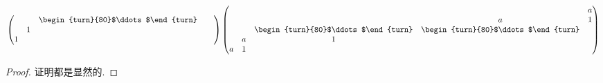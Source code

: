 \documentclass[../../main.tex]{subfiles}
\begin{document}
\begin{lemma}
\begin{align*}
\begin{pmatrix}
& & \begin{turn}{80}$\ddots$\end{turn} & & \\
& 1 & & & \\
1 & & & &
\end{pmatrix}
\begin{pmatrix}
& & & & a \\
& & & a & 1 \\
& & \begin{turn}{80}$\ddots$\end{turn} & \begin{turn}{80}$\ddots$\end{turn} & \\
& a & 1 & & \\
a & 1 & & &
\end{pmatrix}
\end{align*}
\end{lemma}
\begin{proof}
证明都是显然的.

\end{proof}
\end{document}
